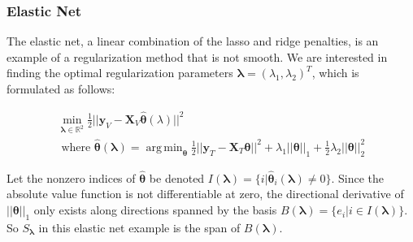 \documentclass[10pt,letterpaper]{article}
\DeclareMathOperator*{\argmin}{arg\,min}
\begin{document}
%



\subsubsection{Elastic Net}

The elastic net, a linear combination of the lasso and ridge penalties, is an example of a regularization method that is not smooth. We are interested in finding the optimal regularization parameters $\boldsymbol{\lambda} = (\lambda_1, \lambda_2)^T$, which is formulated as follows:

\begin{equation}
\begin{array}{c}
\min_{\boldsymbol{\lambda} \in \mathbb{R}^2} \frac{1}{2} \lvert\lvert \boldsymbol{y}_V - \boldsymbol{X}_V \hat{\boldsymbol{\theta}} (\lambda) \rvert\rvert ^2 \\
\text{ where }
\hat{\boldsymbol{\theta}} (\boldsymbol{\lambda}) = \argmin_{\boldsymbol{\theta}} \frac{1}{2} \lvert\lvert \boldsymbol{y}_T - \boldsymbol{X}_T \boldsymbol{\theta} \rvert\rvert ^2
+ \lambda_1 \lvert\lvert \boldsymbol{\theta} \rvert \rvert_1
+ \frac{1}{2}\lambda_2 \lvert\lvert \boldsymbol{\theta} \rvert \rvert_2^2
\end{array}
\end{equation}

Let the nonzero indices of $\hat{\boldsymbol{\theta}}$ be denoted $I(\boldsymbol\lambda) = \{i | \hat{\boldsymbol{\theta}}_i(\boldsymbol\lambda) \ne 0\}$. Since the absolute value function is not differentiable at zero, the directional derivative of $||\boldsymbol \theta||_1$ only exists along directions spanned by the basis $B(\boldsymbol\lambda)=\{e_i | i \in I(\boldsymbol\lambda)\}$. So $S_{\boldsymbol{\lambda}}$ in this elastic net example is the span of $B(\boldsymbol\lambda)$.
\end{document}
